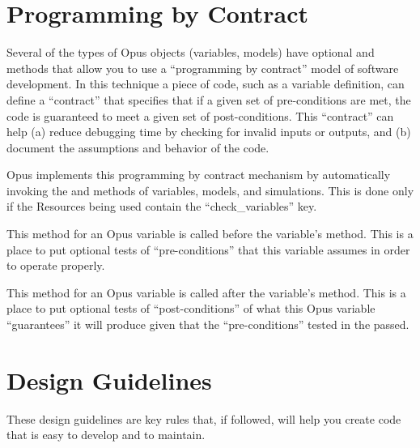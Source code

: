 \section{Programming by Contract}
\label{sec:programming-by-contract}
%
Several of the types of Opus objects (variables, models) have
optional  and  methods that allow you to
use a ``programming by contract'' model of software development. In this
technique a piece of code, such as a variable definition, can define a
``contract'' that specifies that if a given set of pre-conditions are met, the
code is guaranteed to meet a given set of post-conditions. This ``contract''
can help (a) reduce debugging time by checking for invalid inputs or outputs,
and (b) document the assumptions and behavior of the code.

Opus implements this programming by contract mechanism by automatically
invoking the  and  methods of variables,
models, and simulations.  This is done only if the Resources being used
contain the ``check_variables'' key.

\begin{description}

\item[\method{pre_check}] This method for an Opus
variable is called before the variable's  method.  This is a
place to put optional tests of ``pre-conditions'' that this variable assumes in
order to operate properly.

\item[\method{post_check}]  This method for an Opus
variable is called after the variable's  method.  This is a
place to put optional tests of ``post-conditions'' of what this Opus variable
``guarantees'' it will produce given that the ``pre-conditions'' tested in the
 passed.

\end{description}

\section{Design Guidelines}

These design guidelines are key rules that, if followed, will help you
create code that is easy to develop and to maintain.

